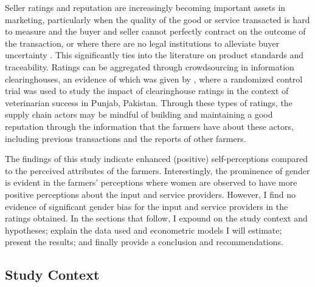 \documentclass[12pt,english]{article}\usepackage[]{graphicx}\usepackage[]{color}
\begin{document}
\begin{onehalfspace}
Seller ratings and reputation are increasingly becoming important
assets in marketing, particularly when the quality of the good or
service transacted is hard to measure and the buyer and seller cannot
perfectly contract on the outcome of the transaction, or where there
are no legal institutions to alleviate buyer uncertainty \citep{BarIsaac2008}.
This significantly ties into the literature on product standards and
traceability. Ratings can be aggregated through crowdsourcing in information
clearinghouses, an evidence of which was given by \citet{Hasanain2019},
where a randomized control trial was used to study the impact of clearinghouse
ratings in the context of veterinarian success in Punjab, Pakistan.
Through these types of ratings, the supply chain actors may be mindful
of building and maintaining a good reputation through the information
that the farmers have about these actors, including previous transactions
and the reports of other farmers.
\end{onehalfspace}

The findings of this study indicate enhanced (positive) self-perceptions
compared to the perceived attributes of the farmers. Interestingly,
the prominence of gender is evident in the farmers' perceptions where
women are observed to have more positive perceptions about the input
and service providers. However, I find no evidence of significant
gender bias for the input and service providers in the ratings obtained.
In the sections that follow, I expound on the study context and hypotheses;
explain the data used and econometric models I will estimate; present
the results; and finally provide a conclusion and recommendations.

\begin{onehalfspace}
\newpage{}
\end{onehalfspace}
\begin{onehalfspace}

\section{Study Context\label{sec:Study-Context}}
\end{onehalfspace}
\end{document}
